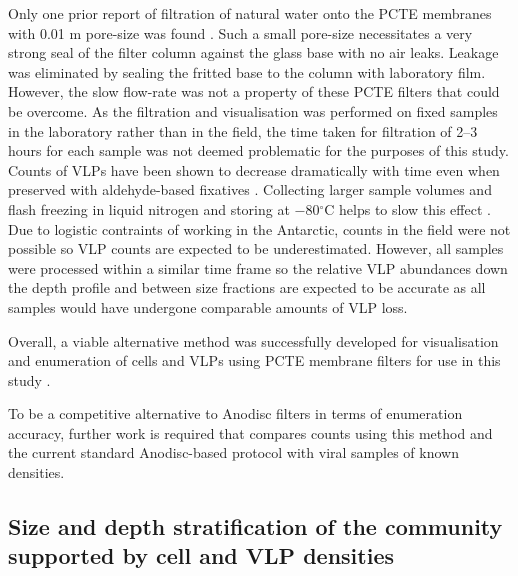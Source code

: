 Only one prior report of filtration of natural water onto the \ac{PCTE} membranes with 0.01 \textmu{}m pore-size was found \cite{Hara1991}.
Such a small pore-size necessitates a very strong seal of the filter column against the glass base with no air leaks.
Leakage was eliminated by sealing the fritted base to the column with laboratory film. 
However, the slow flow-rate was not a property of these \ac{PCTE} filters that could be overcome.
As the filtration and visualisation was performed on fixed samples in the laboratory rather than in the field, the time taken for filtration of 2--3 hours for each sample was not deemed problematic for the purposes of this study.
Counts of \acp{VLP} have been shown to decrease dramatically with time even when preserved with aldehyde-based fixatives \cite{Wen2004}.
Collecting larger sample volumes and flash freezing in liquid nitrogen and storing at $-$80$^{\circ}$C helps to slow this effect \cite{Patel2007}.
Due to logistic contraints of working in the Antarctic, counts in the field were not possible so \ac{VLP} counts are expected to be underestimated.
However, all samples were processed within a similar time frame so the relative \ac{VLP} abundances down the depth profile and between size fractions are expected to be accurate as all samples would have undergone comparable amounts of \ac{VLP} loss. 

Overall, a viable alternative method was successfully developed for visualisation and enumeration of cells and \acp{VLP} using \ac{PCTE} membrane filters for use in this study .

To be a competitive alternative to Anodisc filters in terms of enumeration accuracy, further work is required that compares counts using this method and the current standard Anodisc-based protocol \cite{Patel2007} with viral samples of known densities.


\subsection[Community stratification supported by cell and \acs{VLP} densities]{Size and depth stratification of the community supported by cell and \acs{VLP} densities}

